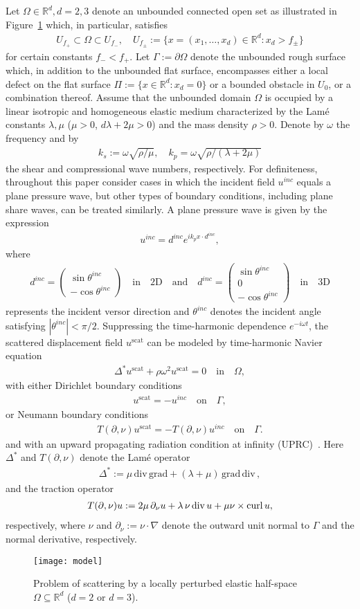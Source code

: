 \documentclass[10pt]{article}
\numberwithin{equation}{section}
\newcommand{\R}{{\mathbb R}}
\newcommand{\be}{\begin{eqnarray}}
\newcommand{\ben}{\begin{eqnarray*}}
\newcommand{\en}{\end{eqnarray}}
\newcommand{\enn}{\end{eqnarray*}}
\newcommand{\pa}{\partial}
\newcommand{\curl}{{\rm curl\,}}
\newcommand{\divv}{{\rm div\,}}
\newcommand{\G}{\Gamma}
\begin{document}
Let $\Omega\in\R^d,d=2,3$ denote an unbounded connected open set as
illustrated in Figure~\ref{model} which, in particular, satisfies \ben
U_{f_+}\subset\Omega\subset U_{f_-},\quad
U_{f_\pm}:=\{x=(x_1,\dots,x_d)\in\R^d: x_d>f_\pm\} \enn for certain
constants $f_-<f_+$.  Let $\Gamma:=\partial\Omega$ denote the
unbounded rough surface which, in addition to the unbounded flat
surface, encompasses either a local defect on the flat surface
$\Pi:=\{x\in\R^d: x_d=0\}$ or a bounded obstacle in $U_0$, or a
combination thereof. Assume that the unbounded domain $\Omega$ is
occupied by a linear isotropic and homogeneous elastic medium
characterized by the Lam\'e constants $\lambda,\mu$ ($\mu>0$,
$d\lambda+2\mu>0$) and the mass density $\rho>0$. Denote by $\omega$
the frequency and by \ben k_s := \omega\sqrt{\rho/\mu},\quad k_p =
\omega \sqrt{\rho/(\lambda + 2\mu)} \enn the shear and compressional
wave numbers, respectively. For definiteness, throughout this paper
consider cases in which the incident field $u^{inc}$ equals a plane
pressure wave, but other types of boundary conditions, including plane
share waves, can be treated similarly. A plane pressure wave is given
by the expression \be
\label{incp}
u^{inc}=d^{inc}e^{ik_px\cdot d^{inc}},
\en
where
\ben
d^{inc}=\begin{pmatrix}
\sin\theta^{inc}\\ -\cos\theta^{inc}
\end{pmatrix}\quad\mbox{in}\quad\mbox{2D}\quad\mbox{and}\quad
d^{inc}=\begin{pmatrix}
\sin\theta^{inc}\\ 0\\ -\cos\theta^{inc}
\end{pmatrix}\quad\mbox{in}\quad\mbox{3D}
\enn
represents the incident versor direction and $\theta^{inc}$ denotes the incident angle satisfying $|\theta^{inc}|<\pi/2$. Suppressing the time-harmonic dependence $e^{-i\omega t}$, the scattered displacement field $u^\mathrm{scat}$ can be modeled by time-harmonic Navier equation
\be
\label{navier}
\Delta^*u^\mathrm{scat}+\rho\omega^2u^\mathrm{scat}=0 \quad\mbox{in}\quad\Omega, \en
with either Dirichlet boundary conditions \ben u^\mathrm{scat}=
-u^{inc}\quad\mbox{on}\quad\Gamma, \enn or Neumann boundary conditions
\ben T(\pa,\nu)u^\mathrm{scat}=-T(\pa,\nu)u^{inc} \quad\mbox{on}\quad\Gamma.
\enn and with an upward propagating radiation condition at infinity
(UPRC)~\cite{AH05,EH12,CGK02}. Here $\Delta^{*}$ and $T(\pa,\nu)$
denote the Lam\'e operator \ben
\label{LameOper}
\Delta^* := \mu\,\mbox{div}\,\mbox{grad} + (\lambda +
\mu)\,\mbox{grad}\, \mbox{div}\,, \enn and the traction operator \be
\label{stress}
T(\pa,\nu)u:=2 \mu \, \partial_{\nu} u + \lambda \, \nu \, \divv u+\mu
\nu\times \curl u, \en respectively, where $\nu$ and
$\partial_\nu:=\nu\cdot\nabla$ denote the outward unit normal to $\G$
and the normal derivative, respectively.
\begin{figure}[ht]
\centering
\texttt{[image: model]}
\caption{Problem of scattering by a locally perturbed elastic
  half-space $\Omega\subseteq \mathbb{R}^d$ ($d=2$ or $d=3$).}
\label{model}
\end{figure}
\end{document}
